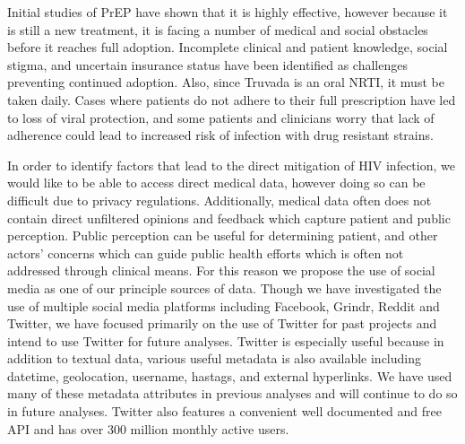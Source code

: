 Initial studies of PrEP have shown that it is highly effective\cite{golub2013efficacy}, however because it is still a new treatment, it is facing a number of medical and social obstacles before it reaches full adoption. Incomplete clinical and patient knowledge, social stigma, and uncertain insurance status have been identified as challenges preventing continued adoption\cite{calabrese2015stigma}. Also, since Truvada is an oral NRTI, it must be taken daily. Cases where patients do not adhere to their full prescription have led to loss of viral protection, and some patients and clinicians worry that lack of adherence could lead to increased risk of infection with drug resistant strains\cite{arnold2012qualitative}.

In order to identify factors that lead to the direct mitigation of HIV infection, we would like to be able to access direct medical data, however doing so can be difficult due to privacy regulations. Additionally, medical data often does not contain direct unfiltered opinions and feedback which capture patient and public perception. Public perception can be useful for determining patient, and other actors' concerns which can guide public health efforts which is often not addressed through clinical means. For this reason we propose the use of social media as one of our principle sources of data. Though we have investigated the use of multiple social media platforms including Facebook, Grindr, Reddit and Twitter, we have focused primarily on the use of Twitter for past projects and intend to use Twitter for future analyses. Twitter is especially useful because in addition to textual data, various useful metadata is also available including datetime, geolocation, username, hastags, and external hyperlinks. We have used many of these metadata attributes in previous analyses and will continue to do so in future analyses. Twitter also features a convenient well documented and free API and has over 300 million monthly active users.

